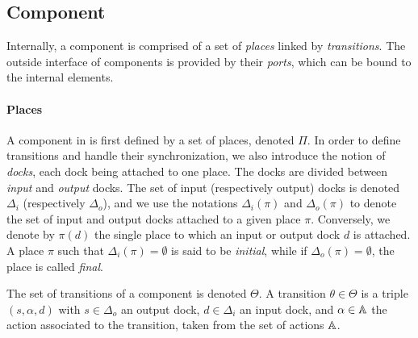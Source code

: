 \subsection{Component}

Internally, a \mad component is comprised of a set of \emph{places}
linked by \emph{transitions}. The outside interface of components is
provided by their \emph{ports}, which can be bound to the internal
elements.

\paragraph{Places}{

A component in \mad is first defined by a set of places, denoted
$\Pi$. In order to define transitions and handle their
synchronization, we also introduce the notion of \emph{docks}, each
dock being attached to one place. The docks are divided between
\emph{input} and \emph{output} docks. The set of input (respectively
output) docks is denoted $\Delta_i$ (respectively $\Delta_o$), and we
use the notations $\Delta_i (\pi)$ and $\Delta_o (\pi)$ to denote the
set of input and output docks attached to a given place
$\pi$. Conversely, we denote by $\pi(d)$ the single place to which an
input or output dock $d$ is attached. A place $\pi$ such that
$\Delta_i(\pi) = \emptyset$ is said to be \emph{initial}, while if
$\Delta_o(\pi) = \emptyset$, the place is called \emph{final}.

The set of transitions of a component is denoted
$\Theta$. A transition $\theta \in \Theta$ is a triple
$\left(s, \alpha, d\right)$ with $s\in\Delta_{o}$ an output dock,
$d\in\Delta_{i}$ an input dock, and $\alpha \in \mathbb{A}$ the action
associated to the transition, taken from the set of actions $\mathbb{A}$.
}

